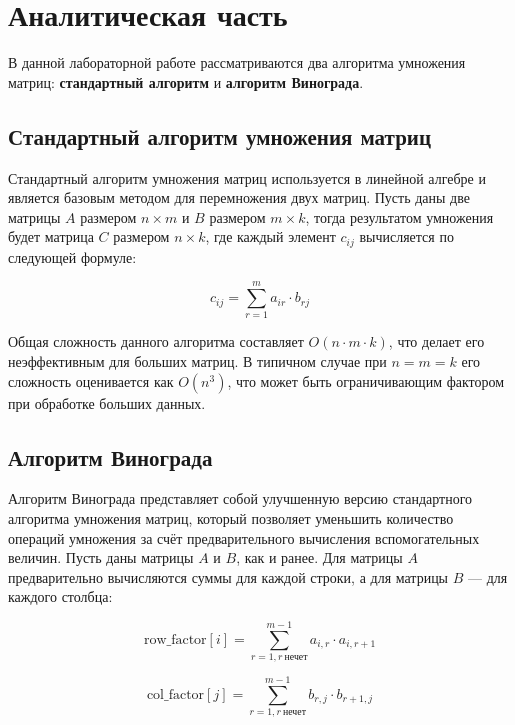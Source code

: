 \chapter{Аналитическая часть}

В данной лабораторной работе рассматриваются два алгоритма умножения матриц: \textbf{стандартный алгоритм} и \textbf{алгоритм Винограда}.

\section{Стандартный алгоритм умножения матриц}

Стандартный алгоритм умножения матриц используется в линейной алгебре и является базовым методом для перемножения двух матриц. Пусть даны две матрицы \( A \) размером \( n \times m \) и \( B \) размером \( m \times k \), тогда результатом умножения будет матрица \( C \) размером \( n \times k \), где каждый элемент \( c_{ij} \) вычисляется по следующей формуле:

\begin{equation}
    \label{eq:std}
    c_{ij} = \sum_{r=1}^{m} a_{ir} \cdot b_{rj}
\end{equation}

Общая сложность данного алгоритма составляет \( O(n \cdot m \cdot k) \), что делает его неэффективным для больших матриц. В типичном случае при \( n = m = k \) его сложность оценивается как \( O(n^3) \), что может быть ограничивающим фактором при обработке больших данных.\cite{std}

\section{Алгоритм Винограда}

Алгоритм Винограда представляет собой улучшенную версию стандартного алгоритма умножения матриц, который позволяет уменьшить количество операций умножения за счёт предварительного вычисления вспомогательных величин. Пусть даны матрицы \( A \) и \( B \), как и ранее. Для матрицы \( A \) предварительно вычисляются суммы для каждой строки, а для матрицы \( B \) — для каждого столбца:

\begin{equation}
    \label{eq:vin1}
    \text{row\_factor}[i] = \sum_{r=1, r\ \text{нечет}}^{m-1} a_{i,r} \cdot a_{i,r+1}
\end{equation}

\begin{equation}
    \label{eq:vin2}
\text{col\_factor}[j] = \sum_{r=1, r\ \text{нечет}}^{m-1} b_{r,j} \cdot b_{r+1,j}
\end{equation}

